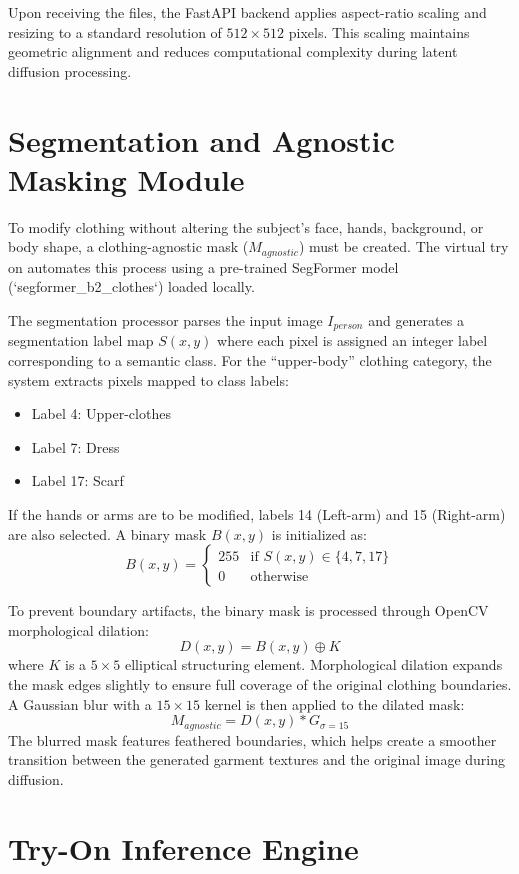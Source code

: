 \documentclass[12pt, a4paper]{report}
\begin{document}
Upon receiving the files, the FastAPI backend applies aspect-ratio scaling and resizing to a standard resolution of $512 \times 512$ pixels. This scaling maintains geometric alignment and reduces computational complexity during latent diffusion processing.

\section{Segmentation and Agnostic Masking Module}

To modify clothing without altering the subject's face, hands, background, or body shape, a clothing-agnostic mask ($M_{agnostic}$) must be created. The virtual try on automates this process using a pre-trained SegFormer model (`segformer_b2_clothes`) loaded locally.

The segmentation processor parses the input image $I_{person}$ and generates a segmentation label map $S(x, y)$ where each pixel is assigned an integer label corresponding to a semantic class. For the ``upper-body'' clothing category, the system extracts pixels mapped to class labels:
\begin{itemize}
\item Label 4: Upper-clothes
\item Label 7: Dress
\item Label 17: Scarf
\end{itemize}
If the hands or arms are to be modified, labels 14 (Left-arm) and 15 (Right-arm) are also selected. A binary mask $B(x, y)$ is initialized as:
\[
B(x, y) = \begin{cases} 
255 & \text{if } S(x, y) \in \{4, 7, 17\} \\
0 & \text{otherwise}
\end{cases}
\]

To prevent boundary artifacts, the binary mask is processed through OpenCV morphological dilation:
\[
D(x, y) = B(x, y) \oplus K
\]
where $K$ is a $5 \times 5$ elliptical structuring element. Morphological dilation expands the mask edges slightly to ensure full coverage of the original clothing boundaries. A Gaussian blur with a $15 \times 15$ kernel is then applied to the dilated mask:
\[
M_{agnostic} = D(x, y) * G_{\sigma=15}
\]
The blurred mask features feathered boundaries, which helps create a smoother transition between the generated garment textures and the original image during diffusion.

\section{Try-On Inference Engine}
\end{document}
